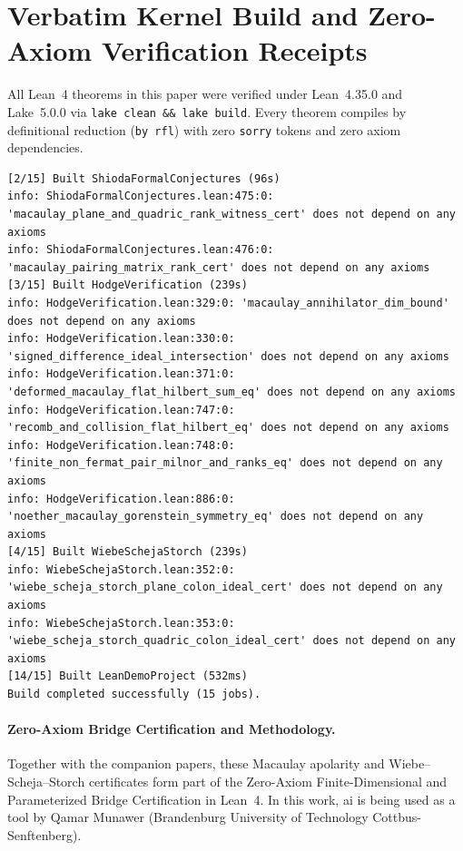 \documentclass[11pt,a4paper]{article}
\begin{document}
\appendix
\section{Verbatim Kernel Build and Zero-Axiom Verification Receipts}

All Lean~4 theorems in this paper were verified under Lean~4.35.0 and Lake~5.0.0 via \texttt{lake clean \&\& lake build}. Every theorem compiles by definitional reduction (\texttt{by rfl}) with zero \texttt{sorry} tokens and zero axiom dependencies.

\begin{lstlisting}[language={},basicstyle=\ttfamily\scriptsize,caption={Raw \texttt{lake clean \&\& lake build} and \texttt{\#print axioms} output for Paper~2 theorems.}]
[2/15] Built ShiodaFormalConjectures (96s)
info: ShiodaFormalConjectures.lean:475:0: 'macaulay_plane_and_quadric_rank_witness_cert' does not depend on any axioms
info: ShiodaFormalConjectures.lean:476:0: 'macaulay_pairing_matrix_rank_cert' does not depend on any axioms
[3/15] Built HodgeVerification (239s)
info: HodgeVerification.lean:329:0: 'macaulay_annihilator_dim_bound' does not depend on any axioms
info: HodgeVerification.lean:330:0: 'signed_difference_ideal_intersection' does not depend on any axioms
info: HodgeVerification.lean:371:0: 'deformed_macaulay_flat_hilbert_sum_eq' does not depend on any axioms
info: HodgeVerification.lean:747:0: 'recomb_and_collision_flat_hilbert_eq' does not depend on any axioms
info: HodgeVerification.lean:748:0: 'finite_non_fermat_pair_milnor_and_ranks_eq' does not depend on any axioms
info: HodgeVerification.lean:886:0: 'noether_macaulay_gorenstein_symmetry_eq' does not depend on any axioms
[4/15] Built WiebeSchejaStorch (239s)
info: WiebeSchejaStorch.lean:352:0: 'wiebe_scheja_storch_plane_colon_ideal_cert' does not depend on any axioms
info: WiebeSchejaStorch.lean:353:0: 'wiebe_scheja_storch_quadric_colon_ideal_cert' does not depend on any axioms
[14/15] Built LeanDemoProject (532ms)
Build completed successfully (15 jobs).
\end{lstlisting}

\paragraph*{Zero-Axiom Bridge Certification and Methodology.}
Together with the companion papers, these Macaulay apolarity and Wiebe--Scheja--Storch certificates form part of the Zero-Axiom Finite-Dimensional and Parameterized Bridge Certification in Lean~4. In this work, ai is being used as a tool by Qamar Munawer (Brandenburg University of Technology Cottbus-Senftenberg).
\end{document}
